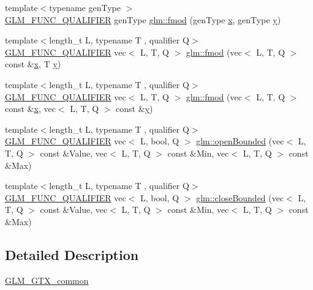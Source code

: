 \begin{DoxyCompactItemize}
\item 
{\footnotesize template$<$typename gen\+Type $>$ }\\\mbox{\hyperlink{setup_8hpp_a33fdea6f91c5f834105f7415e2a64407}{G\+L\+M\+\_\+\+F\+U\+N\+C\+\_\+\+Q\+U\+A\+L\+I\+F\+I\+ER}} gen\+Type \mbox{\hyperlink{namespaceglm_a823bda2877e4dcc4440987f94e0e3690}{glm\+::fmod}} (gen\+Type \mbox{\hyperlink{_s_d_l__opengl_8h_ad0e63d0edcdbd3d79554076bf309fd47}{x}}, gen\+Type \mbox{\hyperlink{_s_d_l__opengl_8h_a1675d9d7bb68e1657ff028643b4037e3}{y}})
\item 
{\footnotesize template$<$length\+\_\+t L, typename T , qualifier Q$>$ }\\\mbox{\hyperlink{setup_8hpp_a33fdea6f91c5f834105f7415e2a64407}{G\+L\+M\+\_\+\+F\+U\+N\+C\+\_\+\+Q\+U\+A\+L\+I\+F\+I\+ER}} vec$<$ L, T, Q $>$ \mbox{\hyperlink{namespaceglm_a1161c55eb5a2058970a6cc7814e43d40}{glm\+::fmod}} (vec$<$ L, T, Q $>$ const \&\mbox{\hyperlink{_s_d_l__opengl_8h_ad0e63d0edcdbd3d79554076bf309fd47}{x}}, T \mbox{\hyperlink{_s_d_l__opengl_8h_a1675d9d7bb68e1657ff028643b4037e3}{y}})
\item 
{\footnotesize template$<$length\+\_\+t L, typename T , qualifier Q$>$ }\\\mbox{\hyperlink{setup_8hpp_a33fdea6f91c5f834105f7415e2a64407}{G\+L\+M\+\_\+\+F\+U\+N\+C\+\_\+\+Q\+U\+A\+L\+I\+F\+I\+ER}} vec$<$ L, T, Q $>$ \mbox{\hyperlink{namespaceglm_ad9141e6a2a35fc3752fa581605f3dac2}{glm\+::fmod}} (vec$<$ L, T, Q $>$ const \&\mbox{\hyperlink{_s_d_l__opengl_8h_ad0e63d0edcdbd3d79554076bf309fd47}{x}}, vec$<$ L, T, Q $>$ const \&\mbox{\hyperlink{_s_d_l__opengl_8h_a1675d9d7bb68e1657ff028643b4037e3}{y}})
\item 
{\footnotesize template$<$length\+\_\+t L, typename T , qualifier Q$>$ }\\\mbox{\hyperlink{setup_8hpp_a33fdea6f91c5f834105f7415e2a64407}{G\+L\+M\+\_\+\+F\+U\+N\+C\+\_\+\+Q\+U\+A\+L\+I\+F\+I\+ER}} vec$<$ L, bool, Q $>$ \mbox{\hyperlink{group__gtx__common_gafd303042ba2ba695bf53b2315f53f93f}{glm\+::open\+Bounded}} (vec$<$ L, T, Q $>$ const \&Value, vec$<$ L, T, Q $>$ const \&Min, vec$<$ L, T, Q $>$ const \&Max)
\item 
{\footnotesize template$<$length\+\_\+t L, typename T , qualifier Q$>$ }\\\mbox{\hyperlink{setup_8hpp_a33fdea6f91c5f834105f7415e2a64407}{G\+L\+M\+\_\+\+F\+U\+N\+C\+\_\+\+Q\+U\+A\+L\+I\+F\+I\+ER}} vec$<$ L, bool, Q $>$ \mbox{\hyperlink{group__gtx__common_gab7d89c14c48ad01f720fb5daf8813161}{glm\+::close\+Bounded}} (vec$<$ L, T, Q $>$ const \&Value, vec$<$ L, T, Q $>$ const \&Min, vec$<$ L, T, Q $>$ const \&Max)
\end{DoxyCompactItemize}


\subsection{Detailed Description}
\mbox{\hyperlink{group__gtx__common}{G\+L\+M\+\_\+\+G\+T\+X\+\_\+common}} 